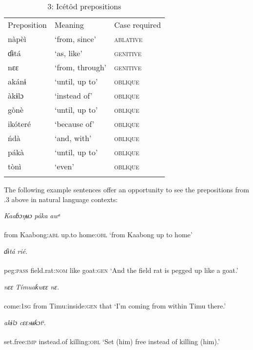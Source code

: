 \begin{table}
\caption{3: Icétôd prepositions}
\label{tab:3}


\begin{tabularx}{\textwidth}{XXX}
\lsptoprule

Preposition & Meaning & Case required\\
nàpèì & ‘from, since’ & \textsc{ablative}\\
ɗɨtá & ‘as, like’ & \textsc{genitive}\\
nɛɛ & ‘from, through’ & \textsc{genitive}\\
akánɨ & ‘until, up to’ & \textsc{oblique}\\
àkɨlɔ & ‘instead of’ & \textsc{oblique}\\
gònè & ‘until, up to’ & \textsc{oblique}\\
ikóteré & ‘because of’ & \textsc{oblique}\\
ńdà & ‘and, with’ & \textsc{oblique}\\
pákà & ‘until, up to’ & \textsc{oblique}\\
tònì & ‘even’ & \textsc{oblique}\\
\lspbottomrule
\end{tabularx}
\end{table}
The following example sentences offer an opportunity to see the prepositions from .3 above in natural language contexts:


 
\ea\label{ex:}
\textit{ Kaaɓɔŋʉɔ}     \textit{páka}\textit{   awᵃ}  \\
    \\
from   Kaabong:\textsc{abl}   up.to   home:\textsc{obl} 
\glt ‘from Kaabong up to home’ 
\z

\ea\label{ex:}
       \textit{ɗɨtá}\textit{   rié.} \\
    \\
peg:\textsc{pass}   field.rat:\textsc{nom}   like   goat:\textsc{gen}
\glt ‘And the field rat is pegged up like a goat.’ 
\z





\ea\label{ex:}
     \textit{nɛɛ}\textit{   Tímuaƙwɛɛ     nɛ.} \\
    \\
come:\textsc{1sg}   from   Timu:inside:\textsc{gen}   that
\glt ‘I’m coming from within Timu there.’ 
\z




\ea\label{ex:}
   \textit{akɨlɔ}\textit{     cɛɛsʉƙɔtᶤ.} \\
    \\
set.free:\textsc{imp}   instead.of   killing:\textsc{obl}
\glt ‘Set (him) free instead of killing (him).’ 
\z




